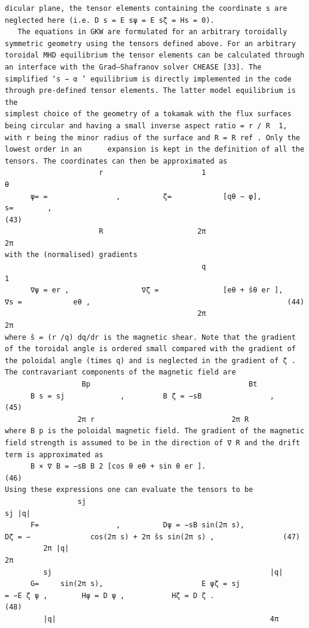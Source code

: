 \documentclass[a4paper]{article}
\newcommand{\gkwpagefont}{\fontsize{6.0pt}{7.55pt}\selectfont}
\begin{document}
\begin{Verbatim}[fontsize=\gkwpagefont]
dicular plane, the tensor elements containing the coordinate s are neglected here (i.e. D s = E sψ = E sζ = Hs = 0).
   The equations in GKW are formulated for an arbitrary toroidally symmetric geometry using the tensors defined above. For an arbitrary
toroidal MHD equilibrium the tensor elements can be calculated through an interface with the Grad–Shafranov solver CHEASE [33]. The
simplified ‘s − α ’ equilibrium is directly implemented in the code through pre-defined tensor elements. The latter model equilibrium is the
simplest choice of the geometry of a tokamak with the flux surfaces being circular and having a small inverse aspect ratio = r / R  1,
with r being the minor radius of the surface and R = R ref . Only the lowest order in an      expansion is kept in the definition of all the
tensors. The coordinates can then be approximated as
                      r                       1                                θ
      ψ= =                ,          ζ=            [qθ − φ],             s=        ,                                                           (43)
                      R                      2π                               2π
with the (normalised) gradients
                                              q                                         1
      ∇ψ = er ,                 ∇ζ =               [eθ + ŝθ er ],           ∇s =            eθ ,                                              (44)
                                             2π                                        2π
where ŝ = (r /q) dq/dr is the magnetic shear. Note that the gradient of the toroidal angle is ordered small compared with the gradient of
the poloidal angle (times q) and is neglected in the gradient of ζ . The contravariant components of the magnetic field are
                  Bp                                     Bt
      B s = sj             ,         B ζ = −sB                ,                                                                                (45)
                 2π r                                2π R
where B p is the poloidal magnetic field. The gradient of the magnetic field strength is assumed to be in the direction of ∇ R and the drift
term is approximated as
      B × ∇ B = −sB B 2 [cos θ eθ + sin θ er ].                                                                                                (46)
Using these expressions one can evaluate the tensors to be
                 sj                                                                     sj |q|
      F=                  ,          Dψ = −sB sin(2π s),                     Dζ = −              cos(2π s) + 2π ŝs sin(2π s) ,                (47)
         2π |q|                                                                         2π
         sj                                                   |q|
      G=     sin(2π s),                       E ψζ = sj               = −E ζ ψ ,        Hψ = D ψ ,           Hζ = D ζ .                        (48)
         |q|                                                  4π
\end{Verbatim}
\end{document}
